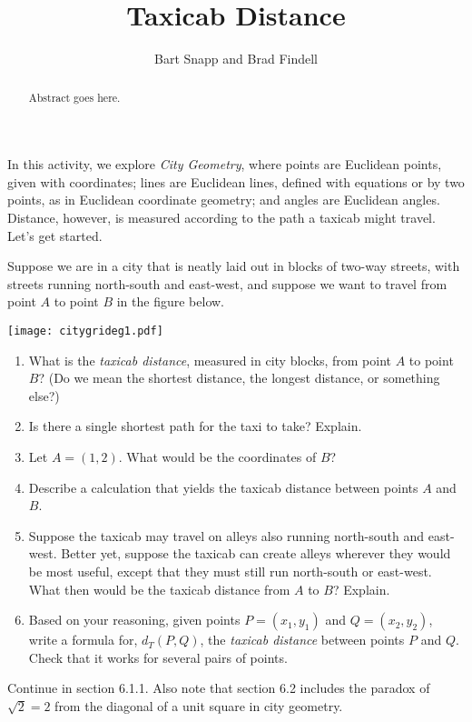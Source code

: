\documentclass{ximera}
\title{Taxicab Distance}
\author{Bart Snapp and Brad Findell}
\begin{document}
\begin{abstract}
Abstract goes here.  
\end{abstract}
\maketitle

In this activity, we explore \emph{City Geometry}, where points are Euclidean points, given with coordinates; lines are Euclidean lines, defined with equations or by two points, as in Euclidean coordinate geometry; and angles are Euclidean angles.  Distance, however, is measured according to the path a taxicab might travel.  Let's get started.  
\begin{problem}
Suppose we are in a city that is neatly laid out in blocks of two-way streets, with streets running north-south and east-west, and suppose we want to travel from point $A$ to point $B$ in the figure below.  
\begin{image}
\texttt{[image: citygrideg1.pdf]}
\end{image}
\begin{enumerate}
\item What is the \emph{taxicab distance}, measured in city blocks, from point $A$ to point $B$?  (Do we mean the shortest distance, the longest distance, or something else?)  
\item Is there a single shortest path for the taxi to take?  Explain.  
\item Let $A = (1,2)$. What would be the coordinates of $B$?  
\item Describe a calculation that yields the taxicab distance between points $A$ and $B$.  
\item Suppose the taxicab may travel on alleys also running north-south and east-west.  Better yet, suppose the taxicab can create alleys wherever they would be most useful, except that they must still run north-south or east-west.  What then would be the taxicab distance from $A$ to $B$?  Explain.  
\item Based on your reasoning, given points $P = (x_1, y_1)$ and $Q= (x_2, y_2)$, write a formula for, $d_T(P,Q)$, the \emph{taxicab distance} between points $P$ and $Q$.  Check that it works for several pairs of points.  
\end{enumerate}
\end{problem}

\begin{teachingnote}
Continue in section 6.1.1. Also note that section 6.2 includes the paradox of $\sqrt{2}=2$ from the diagonal of a unit square in city geometry.
\end{teachingnote}
  
\end{document}
